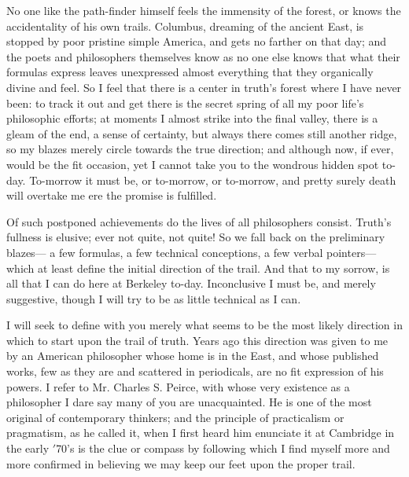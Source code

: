 \documentclass[12pt]{article}
\begin{document}
No one like the path-finder himself feels the immensity of the forest, or knows the accidentality of his own trails. Columbus, dreaming of the ancient East, is stopped by poor pristine simple America, and gets no farther on that day; and the poets and philosophers themselves know as no one else knows that what their formulas express leaves unexpressed almost everything that they organically divine and feel. So I feel that there is a center in truth's forest where I have never been: to track it out and get there is the secret spring of all my poor life's philosophic efforts; at moments I almost strike into the final valley, there is a gleam of the end, a sense of certainty, but always there comes still another ridge, so my blazes merely circle towards the true direction; and although now, if ever, would be the fit occasion, yet I cannot take you to the wondrous hidden spot to-day. To-morrow it must be, or to-morrow, or to-morrow, and pretty surely death will overtake me ere the promise is fulfilled. 

Of such postponed achievements do the lives of all philosophers consist. Truth's fullness is elusive; ever not quite, not quite! So we fall back on the preliminary blazes--- a few formulas, a few technical conceptions, a few verbal pointers--- which at least define the initial direction of the trail. And that to my sorrow, is all that I can do here at Berkeley to-day. Inconclusive I must be, and merely suggestive, though I will try to be as little technical as I can. 

I will seek to define with you merely what seems to be the most likely direction in which to start upon the trail of truth. Years ago this direction was given to me by an American philosopher whose home is in the East, and whose published works, few as they are and scattered in periodicals, are no fit expression of his powers. I refer to Mr. Charles S. Peirce, with whose very existence as a philosopher I dare say many of you are unacquainted. He is one of the most original of contemporary thinkers; and the principle of practicalism or pragmatism, as he called it, when I first heard him enunciate it at Cambridge in the early $'$70's is the clue or compass by following which I find myself more and more confirmed in believing we may keep our feet upon the proper trail. 
\end{document}
